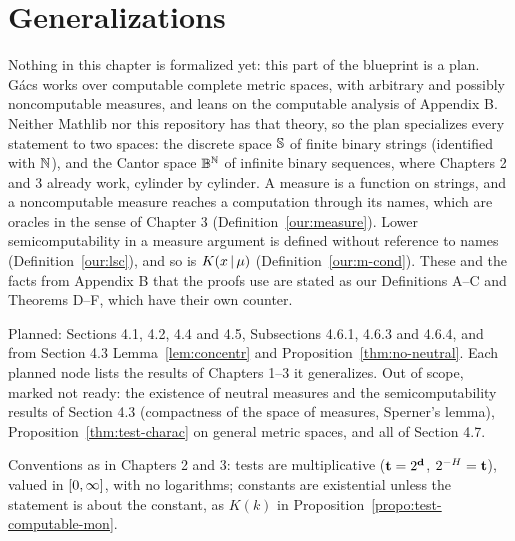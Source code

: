 %

\chapter{Generalizations}

\begin{formalization}
Nothing in this chapter is formalized yet: this part of the blueprint is a plan. G\'acs works
over computable complete metric spaces, with arbitrary and possibly noncomputable measures, and
leans on the computable analysis of Appendix B. Neither Mathlib nor this repository has that
theory, so the plan specializes every statement to two spaces: the discrete space $\mathbb{S}$ of finite
binary strings (identified with $\mathbb{N}$), and the Cantor space $\mathbb{B}^{\mathbb{N}}$ of infinite binary
sequences, where Chapters 2 and 3 already work, cylinder by cylinder. A measure is a function on
strings, and a noncomputable measure reaches a computation through its names, which are oracles
in the sense of Chapter 3 (Definition~\ref{our:measure}). Lower semicomputability in a measure
argument is defined without reference to names (Definition~\ref{our:lsc}), and so is
$K(x \,\vert\, \mu)$ (Definition~\ref{our:m-cond}). These and the facts from Appendix B that the
proofs use are stated as our Definitions A--C and Theorems D--F, which have their own counter.

Planned: Sections 4.1, 4.2, 4.4 and 4.5, Subsections 4.6.1, 4.6.3 and 4.6.4, and from
Section 4.3 Lemma~\ref{lem:concentr} and Proposition~\ref{thm:no-neutral}. Each planned node
lists the results of Chapters 1--3 it generalizes. Out of scope, marked not ready: the existence
of neutral measures and the semicomputability results of Section 4.3 (compactness of the space of
measures, Sperner's lemma), Proposition~\ref{thm:test-charac} on general metric spaces, and all of
Section 4.7.

Conventions as in Chapters 2 and 3: tests are multiplicative ($\mathbf{t} = 2^{\mathbf{d}}$, $2^{-H} = \mathbf{t}$),
valued in $[0,\infty]$, with no logarithms; constants are existential unless the statement
is about the constant, as $K(k)$ in Proposition~\ref{propo:test-computable-mon}.
\end{formalization}

